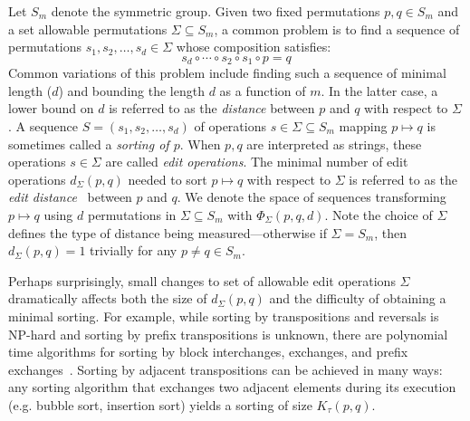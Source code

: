 \documentclass[sn-mathphys]{sn-jnl}
\begin{document}
Let $S_m$ denote the symmetric group. Given two fixed permutations $p, q \in S_m$ and a set allowable permutations $\Sigma \subseteq S_m$,  a common  problem is to find a sequence of permutations $s_1, s_2, \dots, s_d \in \Sigma$ whose composition satisfies:
	\begin{equation}\label{eq:sorting}
		s_d \circ \cdots \circ s_2 \circ s_1 \circ p = q
	\end{equation}
Common variations of this problem include finding such a sequence of minimal length ($d$) and bounding the length $d$ as a function of $m$. In the latter case, a lower bound on $d$ is referred to as the \emph{distance} between $p$ and $q$ with respect to $\Sigma$. 
A sequence $S = (s_1, s_2, \dots, s_d)$ of operations $s \in \Sigma \subseteq S_m$ mapping $p \mapsto q$ is sometimes called a \emph{sorting of $p$}. 
When $p, q$ are interpreted as strings, these operations $s \in \Sigma$ are called \emph{edit operations}. The minimal number of edit operations $d_\Sigma(p, q)$ needed to sort $p \mapsto q$ with respect to $\Sigma$ is referred to as the \emph{edit distance}~\cite{bergroth2000survey} between $p$ and $q$.
We denote the space of sequences transforming $p \mapsto q$ using $d$ permutations in $\Sigma \subseteq S_m$ with $\Phi_\Sigma(p,q,d)$.
Note the choice of $\Sigma$ defines the type of distance being measured---otherwise if $\Sigma = S_m$, then $d_\Sigma(p, q) = 1$ trivially for any $p\neq  q \in S_m$.

Perhaps surprisingly, small changes to set of allowable edit operations $\Sigma$ dramatically affects both the size of $d_\Sigma(p,q)$ and the difficulty of obtaining a minimal sorting. 
For example, while sorting by transpositions and reversals is NP-hard and sorting by prefix  transpositions is unknown, there are polynomial time algorithms for sorting by block interchanges, exchanges, and prefix exchanges~\cite{labarre2013lower}. Sorting by adjacent transpositions can be achieved in many ways: any sorting algorithm that exchanges two adjacent elements during its execution (e.g. bubble sort, insertion sort) yields a sorting of size $K_\tau(p, q)$.  
\end{document}
